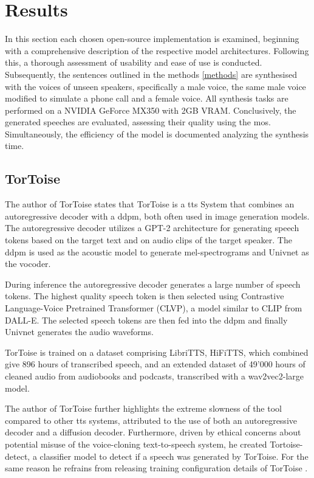 \newpage
\section{Results}
In this section each chosen open-source implementation is examined, beginning with a comprehensive description of the respective model architectures. Following this, a thorough assessment of usability and ease of use is conducted. Subsequently, the sentences outlined in the methods \ref{methods} are synthesised with the voices of unseen speakers, specifically a male voice, the same male voice modified to simulate a phone call and a female voice. All synthesis tasks are performed on a NVIDIA GeForce MX350 with 2GB VRAM. Conclusively, the generated speeches are evaluated, assessing their quality using the \gls{mos}. Simultaneously, the efficiency of the model is documented analyzing the synthesis time.

\subsection{TorToise}
The author of TorToise \cite{betker2023better} states that TorToise is a \gls{tts} System that combines an autoregressive decoder with a \gls{ddpm}, both often used in image generation models.
The autoregressive decoder utilizes a GPT-2 architecture for generating speech tokens based on the target text and on audio clips of the target speaker. The \gls{ddpm} is used as the acoustic model to generate mel-spectrograms and Univnet as the vocoder.

During inference the autoregressive decoder generates a large number of speech tokens. The highest quality speech token is then selected using Contrastive Language-Voice Pretrained Transformer (CLVP), a model similar to CLIP from DALL-E. The selected speech tokens are then fed into the \gls{ddpm} and finally Univnet generates the audio waveforms.

TorToise is trained on a dataset comprising LibriTTS, HiFiTTS, which combined give 896 hours of transcribed speech, and an extended dataset of 49'000 hours of cleaned audio from audiobooks and podcasts, transcribed with a wav2vec2-large model.

The author of TorToise further highlights the extreme slowness of the tool compared to other \gls{tts} systems, attributed to the use of both an autoregressive decoder and a diffusion decoder.
Furthermore, driven by ethical concerns about potential misuse of the voice-cloning text-to-speech system, he created Tortoise-detect, a classifier model to detect if a speech was generated by TorToise. For the same reason he refrains from releasing training configuration details of TorToise \cite{betker_tortoise_2022}.

